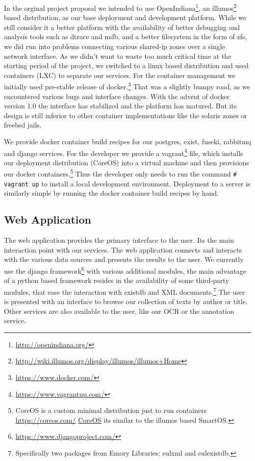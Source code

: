\documentclass[12pt, draft]{article}
\begin{document}
In the orginal project proposal we intended to use OpenIndiana\footnote{\url{http://openindiana.org/}},
an illumos\footnote{\url{http://wiki.illumos.org/display/illumos/illumos+Home}}
 based distribution, as our base deployment and development
platform.
While we still consider it a better platform with
the availability of better debugging and analysis tools
such as dtrace and mdb, and a better filesystem in the form of zfs,
we did run into problems connecting various shared-ip zones over a single network interface.
As we didn't want to waste too much critical time at the
starting period of the project, we switched to a linux based
distribution and used containers (LXC) to separate our
services.  For the container management we initially
used pre-stable release of docker.\footnote{\url{https://www.docker.com/}}
That was a slightly
bumpy road, as we encountered various bugs and interface changes.
With the advent of docker version 1.0 the interface has
stabilized and the platform has matured.
But its design is still inferior to other
container implementations like the solaris zones or freebsd jails.

We provide docker container build recipes for our
postgres, exist, fuseki, rabbitmq and django services.
For the developer we provide a vagrant\footnote{\url{https://www.vagrantup.com/}}
 file, which 
installs our deployment distribution (CoreOS)
into a virtual machine and then provisions our
docker containers.\footnote{CoreOS is a custom minimal distribution just to run
containers \url{https://coreos.com/} \href{https://coreos.com/}{CoreOS} its similar to the illumos based SmartOS.}
Thus the developer only needs to run the command \lstinline ´# vagrant up´
to install a local development environment.
Deployment to a server is similarly simple by running the docker container build recipes
by hand.

\subsection{Web Application}

The web application provides the primary interface to the user. Its the main
interaction point with our services.
The web application connects and interacts with the various data sources and presents
the results to the user.
We currently use the django framework\footnote{\url{https://www.djangoproject.com/}}
 with various additional modules,
the main advantage of a python based framework resides in the availability
of some third-party modules, that ease the interaction with existdb and XML
documents.\footnote{Specifically two packages from Emory Libraries: eulxml and eulexistdb.}
The user is presented with an interface to browse our collection of texts by
author or title.  Other services are also available to the user, like our
OCR or the annotation service.
\end{document}

